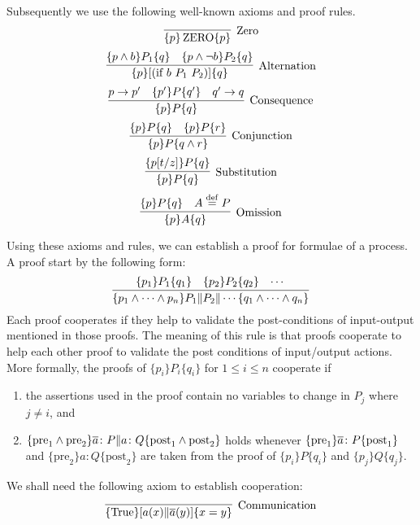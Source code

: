 \documentclass[12pt,a4paper,titlepage]{article}
\theoremstyle{break}
\begin{document}
Subsequently we use the following well-known axioms and proof rules.
  \begin{displaymath}
\infer[\mbox{Zero}]
      {\{p\}\ZERO\{p\}}
      {}
  \end{displaymath}
  \begin{displaymath}
\infer[\mbox{Alternation}]
      {\{p\}[(\mbox{if}\ b\ P_1\ P_2)]\{q\}}
      {\{p\wedge b\}P_1\{q\}&\{p\wedge \neg b\}P_2\{q\}}
  \end{displaymath}
  \begin{displaymath}
\infer[\mbox{Consequence}]
      {\{p\}P\{q\}}
      {p\rightarrow p'&\{p'\}P\{q'\}&q'\rightarrow q}
  \end{displaymath}
  \begin{displaymath}
\infer[\mbox{Conjunction}]
      {\{p\}P\{q\wedge r\}}
      {\{p\}P\{q\}&\{p\}P\{r\}}
  \end{displaymath}
  \begin{displaymath}
\infer[\mbox{Substitution}]
      {\{p\}P\{q\}}
      {\{p[t/z]\}P\{q\}}
  \end{displaymath}
  \begin{displaymath}
\infer[\mbox{Omission}]
      {\{p\}A\{q\}}
      {\{p\}P\{q\}&A\procdef P}
  \end{displaymath}

Using these axioms and rules, we can establish a proof for formulae of a process.
A proof start by the following form:
  \begin{displaymath}
\infer{\{p_1\wedge\cdots\wedge p_n\}P_1\|P_2\|\cdots\{q_1\wedge\cdots\wedge q_n\}}
      {\{p_1\}P_1\{q_1\}&\{p_2\}P_2\{q_2\}&\cdots}
  \end{displaymath}
Each proof cooperates if they help to validate the post-conditions of input-output mentioned in those proofs.
The meaning of this rule is that proofs cooperate to help each other proof to validate the post conditions of input/output actions.
More formally, the proofs of \(\{p_i\}P_i\{q_i\}\) for \(1\leq i\leq n\) cooperate if 
  \begin{enumerate}
\item the assertions used in the proof contain no variables to change in \(P_j\) where \(j\neq i\), and
\item \(\{\mbox{pre}_1\wedge\mbox{pre}_2\}\mbox{$\overline{a}$}\colon P\|a\colon Q\{\mbox{post}_1\wedge\mbox{post}_2\}\) holds
whenever \(\{\mbox{pre}_1\}\mbox{$\overline{a}$}\colon P\{\mbox{post}_1\}\) and \(\{\mbox{pre}_2\}a\colon Q\{\mbox{post}_2\}\) are taken from the proof of \(\{p_i\}P\{q_i\}\) and \(\{p_j\}Q\{q_j\}\).
  \end{enumerate}
We shall need the following axiom to establish cooperation:
  \begin{displaymath}
\infer[\mbox{Communication}]
      {\{\Truerm\}[a(x)\|\bijection{a}(y)]\{x=y\}}
      {}
  \end{displaymath}
\end{document}
